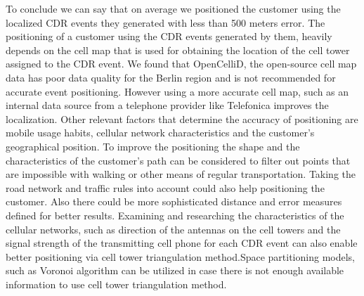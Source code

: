 To conclude we can say that on average we positioned the customer using the localized CDR events they generated with less than 500 meters error.
The positioning of a customer using the CDR events generated by them, heavily depends on the cell map that is used for obtaining the location of the cell tower assigned to the CDR event. 
We found that OpenCelliD, the open-source cell map data has poor data quality for the Berlin region and is not recommended for accurate event positioning. 
However using a more accurate cell map, such as an internal data source from a telephone provider like Telefonica improves the localization.
Other relevant factors that determine the accuracy of positioning are mobile usage habits, cellular network characteristics and the customer's geographical position.
To improve the positioning the shape and the characteristics of the customer's path can be considered to filter out points that are impossible with walking or other means of regular transportation. Taking the road network and traffic rules into account could also help positioning the customer. Also there could be more sophisticated distance and error measures defined for better results.
Examining and researching the characteristics of the cellular networks, such as direction of the antennas on the cell towers and the signal strength of the transmitting cell phone for each CDR event can also enable better positioning via cell tower triangulation method.Space partitioning models, such as Voronoi algorithm can be utilized in case there is not enough available information to use cell tower triangulation method.

